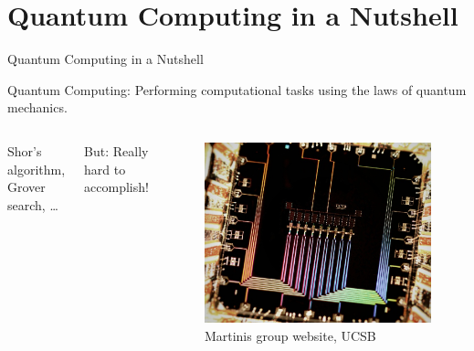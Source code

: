 \section{Quantum Computing in a Nutshell}

\begin{frame}{Quantum Computing in a Nutshell}

\begin{block}{Quantum Computing:}
 Performing computational tasks using the laws of quantum mechanics.
\end{block}

 \begin{columns}
  
  Shor's algorithm, Grover search, \dots
  
  \vspace{\floatsep}
  
  \alert{But: Really hard to accomplish!}
  
    \begin{figure}
     \centering
     \includegraphics[width=\linewidth]{gfx/Linear9XmonSurfaceCode}
     \caption{\footnotesize Martinis group website, UCSB}
    \end{figure}

 \end{columns}


\end{frame}


